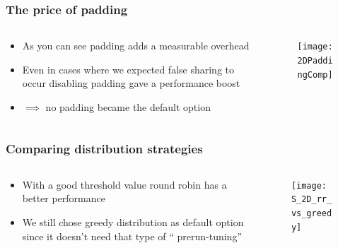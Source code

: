 \begin{frame}
	\frametitle{The price of padding}
	\vspace{0.8cm}
	\begin{columns}
		\begin{column}{0.4\linewidth}
			\large
			\begin{itemize}
				\setlength\itemsep{1em}
				\item As you can see padding adds a measurable overhead
				\item Even in cases where we expected false sharing to occur disabling padding gave a performance boost
				\item $\implies$ no padding became the default option
			\end{itemize}
			
		\end{column}
		\begin{column}{0.6\linewidth}
			\vspace{-1.6cm}
				\begin{figure}
				\centering
				\texttt{[image: 2DPaddingComp]}
				\label{fig:2dpaddingcomp}
			\end{figure}
		\end{column}
	\end{columns}
\end{frame}

\begin{frame}
	\frametitle{Comparing distribution strategies}
	\begin{columns}
		\begin{column}{0.4\linewidth}
			\large
			\vspace{0.6cm}
			\begin{itemize}
				\setlength\itemsep{1em}
				\item With a good threshold value round robin has a better performance
				\item We still chose greedy distribution as default option since it doesn't need that type of "` prerun-tuning"'
			\end{itemize}
			
		\end{column}
		\begin{column}{0.6\linewidth}
			\begin{figure}
				\centering
				\texttt{[image: S\_2D\_rr\_vs\_greedy]}
				\label{fig:s2drrvsgreedy}
			\end{figure}
			
		\end{column}
	\end{columns}
\end{frame}

